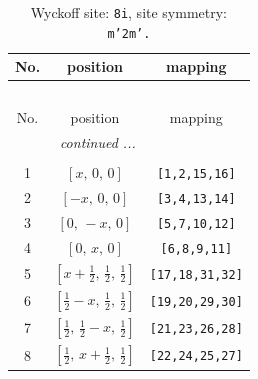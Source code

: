 \documentclass[fleqn,8pt]{jsarticle}
\begin{document}
\begin{longtable}{ccc}
\caption{Wyckoff site: {\tt 8i}, site symmetry: {\tt m'2m'.}}
 \\
 \hline \hline
No. & position & mapping \\ \hline \endfirsthead

\multicolumn{2}{l}{\tablename\ \thetable{}} \\
 \hline \hline
No. & position & mapping \\ \hline \endhead

 \hline \hline
\multicolumn{2}{r}{\footnotesize\it continued ...} \\ \endfoot

 \hline \hline
\multicolumn{2}{r}{} \\ \endlastfoot

1 & $\left[ x,\, 0,\, 0 \right]$ & {\tt [1,2,15,16]} \\ \hline
2 & $\left[ - x,\, 0,\, 0 \right]$ & {\tt [3,4,13,14]} \\ \hline
3 & $\left[ 0,\, - x,\, 0 \right]$ & {\tt [5,7,10,12]} \\ \hline
4 & $\left[ 0,\, x,\, 0 \right]$ & {\tt [6,8,9,11]} \\ \hline
5 & $\left[ x + \frac{1}{2},\, \frac{1}{2},\, \frac{1}{2} \right]$ & {\tt [17,18,31,32]} \\ \hline
6 & $\left[ \frac{1}{2} - x,\, \frac{1}{2},\, \frac{1}{2} \right]$ & {\tt [19,20,29,30]} \\ \hline
7 & $\left[ \frac{1}{2},\, \frac{1}{2} - x,\, \frac{1}{2} \right]$ & {\tt [21,23,26,28]} \\ \hline
8 & $\left[ \frac{1}{2},\, x + \frac{1}{2},\, \frac{1}{2} \right]$ & {\tt [22,24,25,27]} \\
\end{longtable}
\renewcommand{\arraystretch}{1.2}
\end{document}
